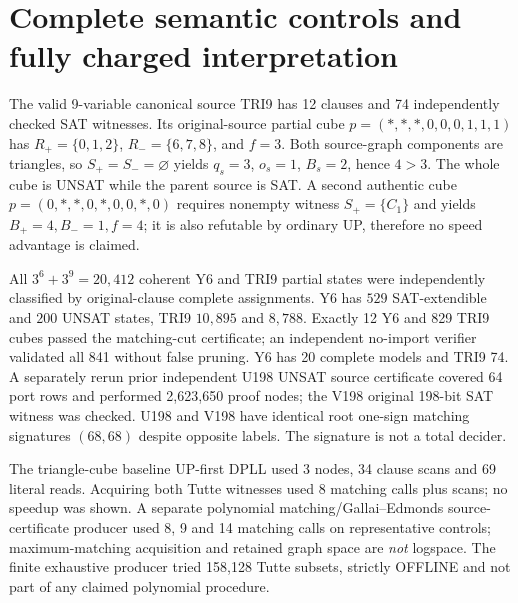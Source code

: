 \documentclass[10pt]{article}
\begin{document}
\section{Complete semantic controls and fully charged interpretation}
The valid 9-variable canonical source TRI9 has 12 clauses and 74 independently checked SAT witnesses. Its original-source partial cube $p=(\ast,\ast,\ast,0,0,0,1,1,1)$ has $R_+=\{0,1,2\}$, $R_-=\{6,7,8\}$, and $f=3$. Both source-graph components are triangles, so $S_+=S_-=\varnothing$ yields $q_s=3$, $o_s=1$, $B_s=2$, hence $4>3$. The whole cube is UNSAT while the parent source is SAT. A second authentic cube $p=(0,\ast,\ast,0,\ast,0,0,\ast,0)$ requires nonempty witness $S_+=\{C_1\}$ and yields $B_+=4,B_-=1,f=4$; it is also refutable by ordinary UP, therefore no speed advantage is claimed.

All $3^6+3^9=20{,}412$ coherent Y6 and TRI9 partial states were independently classified by original-clause complete assignments. Y6 has $529$ SAT-extendible and $200$ UNSAT states, TRI9 $10{,}895$ and $8{,}788$. Exactly 12 Y6 and 829 TRI9 cubes passed the matching-cut certificate; an independent no-import verifier validated all 841 without false pruning. Y6 has 20 complete models and TRI9 74. A separately rerun prior independent U198 UNSAT source certificate covered 64 port rows and performed 2,623,650 proof nodes; the V198 original 198-bit SAT witness was checked. U198 and V198 have identical root one-sign matching signatures $(68,68)$ despite opposite labels. The signature is not a total decider.

The triangle-cube baseline UP-first DPLL used 3 nodes, 34 clause scans and 69 literal reads. Acquiring both Tutte witnesses used 8 matching calls plus scans; no speedup was shown. A separate polynomial matching/Gallai--Edmonds source-certificate producer used 8, 9 and 14 matching calls on representative controls; maximum-matching acquisition and retained graph space are \emph{not} logspace. The finite exhaustive producer tried 158,128 Tutte subsets, strictly OFFLINE and not part of any claimed polynomial procedure.
\end{document}
